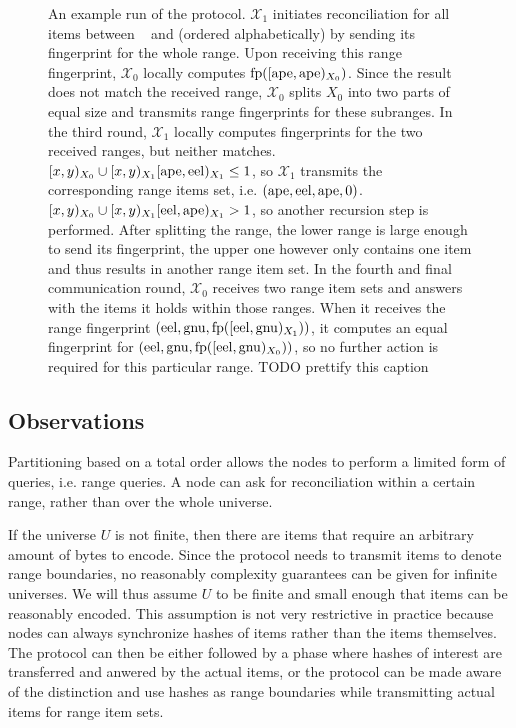 \begin{figure*}
\caption{
An example run of the protocol. $\mathcal{X}_1$ initiates reconciliation for all items between \examplea~ and \examplei (ordered alphabetically) by sending its fingerprint for the whole range.
Upon receiving this range fingerprint, $\mathcal{X}_0$ locally computes $\operatorname{fp}([{\mathrm{ape}},{\mathrm{ape}})_{X_0})$. Since the result does not match the received range, $\mathcal{X}_0$ splits $X_0$ into two parts of equal size and transmits range fingerprints for these subranges.
In the third round, $\mathcal{X}_1$ locally computes fingerprints for the two received ranges, but neither matches. $[{x},{y})_{X_0} \cup [{x},{y})_{X_1}{[{\mathrm{ape}},{\mathrm{eel}})_{X_1}} \leq 1$, so $\mathcal{X}_1$ transmits the corresponding range items set, i.e. $({\mathrm{ape}}, {\mathrm{eel}}, {\mathrm{ape}}, {0})$. $[{x},{y})_{X_0} \cup [{x},{y})_{X_1}{[{\mathrm{eel}},{\mathrm{ape}})_{X_1}} > 1$, so another recursion step is performed. After splitting the range, the lower range is large enough to send its fingerprint, the upper one however only contains one item and thus results in another range item set.
In the fourth and final communication round, $\mathcal{X}_0$ receives two range item sets and answers with the items it holds within those ranges. When it receives the range fingerprint $({\mathrm{eel}}, {\mathrm{gnu}}, {\operatorname{fp}([{\mathrm{eel}},{\mathrm{gnu}})_{X_1})})$, it computes an equal fingerprint for $({\mathrm{eel}}, {\mathrm{gnu}}, {\operatorname{fp}([{\mathrm{eel}},{\mathrm{gnu}})_{X_0})})$, so no further action is required for this particular range. TODO prettify this caption
}

\label{simple-set-reconciliation-example}
\end{figure*}

\subsection{Observations}
\label{observations}

Partitioning based on a total order allows the nodes to perform a limited form of queries, i.e. range queries. A node can ask for reconciliation within a certain range, rather than over the whole universe.

If the universe $U$ is not finite, then there are items that require an arbitrary amount of bytes to encode. Since the protocol needs to transmit items to denote range boundaries, no reasonably complexity guarantees can be given for infinite universes. We will thus assume $U$ to be finite and small enough that items can be reasonably encoded. This assumption is not very restrictive in practice because nodes can always synchronize hashes of items rather than the items themselves. The protocol can then be either followed by a phase where hashes of interest are transferred and anwered by the actual items, or the protocol can be made aware of the distinction and use hashes as range boundaries while transmitting actual items for range item sets.

